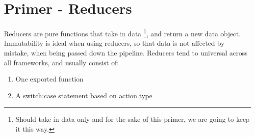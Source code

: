 \maketitle{}
\section{ Primer - Reducers }
Reducers are pure functions that take in data \footnote{Should take in data only
and for the sake of this primer, we are going to keep it this way.}, and return
a new data object. Immutability is ideal when using reducers, so that data is
not affected by mistake, when being passed down the pipeline. Reducers tend to
universal across all frameworks, and usually consist of:
\begin{enumerate}
  \item One exported function
  \item A switch:case statement based on action.type
\end{enumerate}
